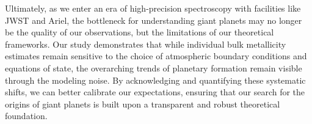 \documentclass{aa}
\begin{document}
Ultimately, as we enter an era of high-precision spectroscopy with facilities like JWST and Ariel, the bottleneck for understanding giant planets may no longer be the quality of our observations, but the limitations of our theoretical frameworks. Our study demonstrates that while individual bulk metallicity estimates remain sensitive to the choice of atmospheric boundary conditions and equations of state, the overarching trends of planetary formation remain visible through the modeling noise. By acknowledging and quantifying these systematic shifts, we can better calibrate our expectations, ensuring that our search for the origins of giant planets is built upon a transparent and robust theoretical foundation.









%





\end{document}
